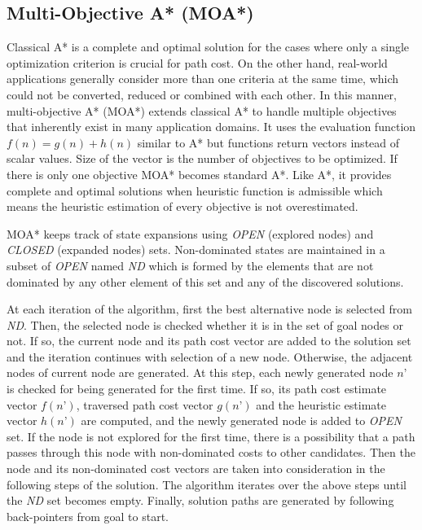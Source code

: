 \documentclass[10pt,journal]{IEEEtran}
\begin{document}
\subsection{Multi-Objective A* (MOA*)}

Classical A* \cite{AStarHart:1968} is a complete and optimal solution for the cases where only a single optimization criterion is crucial for path cost. On the other hand, real-world applications generally consider more than one criteria at the same time, which could not be converted, reduced or combined with each other. In this manner, multi-objective A* (MOA*) \cite{MOAStewart:1991} extends classical A* to handle multiple objectives that inherently exist in many application domains. It uses the evaluation function $f(n) = g(n) + h(n)$ similar to A* but functions return vectors instead of scalar values. Size of the vector is the number of objectives to be optimized. If there is only one objective MOA* becomes standard A*. Like A*, it provides complete and optimal solutions when heuristic function is admissible which means the heuristic estimation of every objective is not overestimated.

MOA* keeps track of state expansions using {\it OPEN} (explored nodes) and {\it CLOSED} (expanded nodes) sets. Non-dominated states are maintained in a subset of {\it OPEN} named {\it ND} which is formed by the elements that are not dominated by any other element of this set and any of the discovered solutions.

At each iteration of the algorithm, first the best alternative node is selected from {\it ND}. Then, the selected node is checked whether it is in the set of goal nodes or not. If so, the current node and its path cost vector are added to the solution set and the iteration continues with selection of a new node. Otherwise, the adjacent nodes of current node are generated. At this step, each newly generated node $n’$ is checked for being generated for the first time. If so, its path cost estimate vector $f(n’)$, traversed path cost vector $g(n’)$ and the heuristic estimate vector $h(n’)$ are computed, and the newly generated node is added to {\it OPEN} set. If the node is not explored for the first time, there is a possibility that a path passes through this node with non-dominated costs to other candidates. Then the node and its non-dominated cost vectors are taken into consideration in the following steps of the solution. The algorithm iterates over the above steps until the {\it ND} set becomes empty. Finally, solution paths are generated by following back-pointers from goal to start. 
\end{document}
